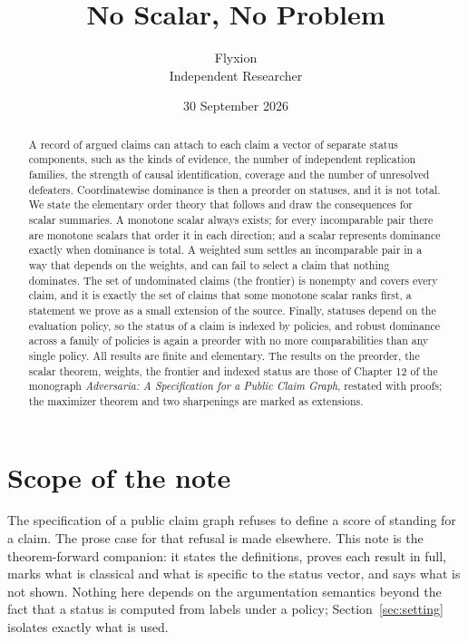 \documentclass[11pt]{article}
\title{No Scalar, No Problem}
\author{Flyxion\\\small Independent Researcher}
\date{30 September 2026}
\theoremstyle{plain}
\theoremstyle{definition}
\theoremstyle{remark}
\begin{document}
\maketitle

\begin{abstract}
\noindent
A record of argued claims can attach to each claim a vector of separate status components, such as the kinds of evidence, the number of independent replication families, the strength of causal identification, coverage and the number of unresolved defeaters. Coordinatewise dominance is then a preorder on statuses, and it is not total. We state the elementary order theory that follows and draw the consequences for scalar summaries. A monotone scalar always exists; for every incomparable pair there are monotone scalars that order it in each direction; and a scalar represents dominance exactly when dominance is total. A weighted sum settles an incomparable pair in a way that depends on the weights, and can fail to select a claim that nothing dominates. The set of undominated claims (the frontier) is nonempty and covers every claim, and it is exactly the set of claims that some monotone scalar ranks first, a statement we prove as a small extension of the source. Finally, statuses depend on the evaluation policy, so the status of a claim is indexed by policies, and robust dominance across a family of policies is again a preorder with no more comparabilities than any single policy. All results are finite and elementary. The results on the preorder, the scalar theorem, weights, the frontier and indexed status are those of Chapter 12 of the monograph \emph{Adversaria: A Specification for a Public Claim Graph}, restated with proofs; the maximizer theorem and two sharpenings are marked as extensions.
\end{abstract}

\section{Scope of the note}\label{sec:intro}

The specification of a public claim graph refuses to define a score of standing for a claim. The prose case for that refusal is made elsewhere. This note is the theorem-forward companion: it states the definitions, proves each result in full, marks what is classical and what is specific to the status vector, and says what is not shown. Nothing here depends on the argumentation semantics beyond the fact that a status is computed from labels under a policy; Section~\ref{sec:setting} isolates exactly what is used.
\end{document}
